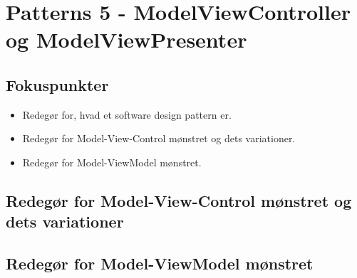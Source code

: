 \section{Patterns 5 - ModelViewController og ModelViewPresenter}

\subsection{Fokuspunkter}

\begin{itemize}
	\item Redegør for, hvad et software design pattern er.
	\item Redegør for Model-View-Control mønstret og dets variationer.
	\item Redegør for Model-ViewModel mønstret.
\end{itemize}



\subsection{Redegør for Model-View-Control mønstret og dets variationer}
\derp

\subsection{Redegør for Model-ViewModel mønstret}
\derp
